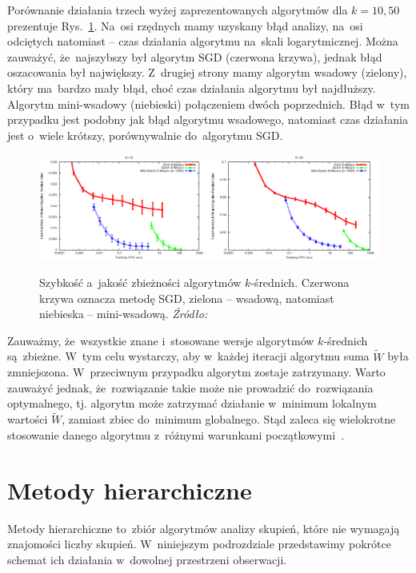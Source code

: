 \documentclass{praca1}
\begin{document}
Porównanie działania trzech wyżej zaprezentowanych algorytmów dla $k=10, 50$ prezentuje Rys.~\ref{plot:000}. Na~osi rzędnych mamy uzyskany błąd analizy, na~osi odciętych natomiast -- czas działania algorytmu na~skali logarytmicznej. Można zauważyć, że~najszybszy był algorytm SGD (czerwona krzywa), jednak błąd oszacowania był największy. Z~drugiej strony mamy algorytm wsadowy (zielony), który ma~bardzo mały błąd, choć czas działania algorytmu był najdłuższy. Algorytm mini-wsadowy (niebieski) połączeniem dwóch poprzednich. Błąd w~tym przypadku jest podobny jak błąd algorytmu wsadowego, natomiast czas działania jest o~wiele krótszy, porównywalnie do~algorytmu SGD. 

\begin{figure}[!h]
  \centering
  \includegraphics[width=450pt]{plot0.png}\\
  \caption{Szybkość a~jakość zbieżności algorytmów $k$-średnich. Czerwona krzywa oznacza metodę SGD, zielona -- wsadową, natomiast niebieska -- mini-wsadową. \emph{Źródło:}~\cite{Sculley2010:webkmeans}}\label{plot:000}
\end{figure}


Zauważmy, że~wszystkie znane i~stosowane wersje algorytmów $k$-średnich są~zbieżne. W~tym celu wystarczy, aby w~każdej iteracji algorytmu suma $\widetilde{W}$ była zmniejszona. W~przeciwnym przypadku algorytm zostaje zatrzymany. Warto zauważyć jednak, że~rozwiązanie takie może nie prowadzić do~rozwiązania optymalnego, tj. algorytm może zatrzymać działanie w~minimum lokalnym wartości $\widetilde{W}$, zamiast zbiec do~minimum globalnego. Stąd zaleca się wielokrotne stosowanie danego algorytmu z~różnymi warunkami początkowymi~\cite{Koronacki2005:statystyczne}.


\section{Metody hierarchiczne}

Metody hierarchiczne to~zbiór algorytmów analizy skupień, które nie wymagają znajomości liczby skupień. W~niniejszym podrozdziale przedstawimy pokrótce schemat ich działania w~dowolnej przestrzeni obserwacji.
\end{document}
